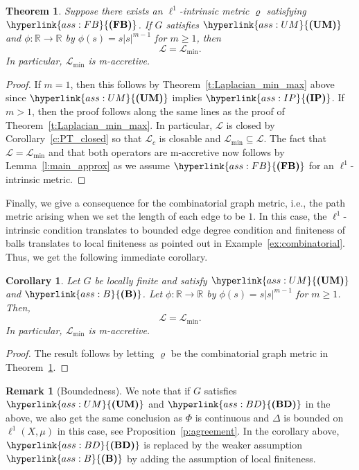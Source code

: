 \documentclass[letterpaper]{article}
\newtheorem{theorem}[lemma]{Theorem}
\newtheorem{corollary}[lemma]{Corollary}
\theoremstyle{definition}
\newtheorem{remark}[lemma]{Remark}
\theoremstyle{named}
\numberwithin{equation}{section}
\newcommand{\IP}{\hyperlink{ass:IP}{\textup{\textbf{(IP)}}}}
\newcommand{\UM}{\hyperlink{ass:UM}{\textup{\textbf{(UM)}}}}
\newcommand{\B}{\hyperlink{ass:B}{\textup{\textbf{(B)}}}}
\newcommand{\BD}{\hyperlink{ass:BD}{\textup{\textbf{(BD)}}}}
\newcommand{\FB}{\hyperlink{ass:FB}{\textup{\textbf{(FB)}}}}
\newcommand{\R}{\mathbb{R}}
\newcommand{\Deltaphi}{\mathcal{L}}
\newcommand{\deltaphim}{\mathcal{L}_{\min}}
\begin{document}
\begin{theorem}\label{t:min=max}
Suppose there exists an $\ell^1$-intrinsic metric $\varrho$ satisfying $\FB$.
If $G$ satisfies $\UM$ and $\phi\colon \R \to \R$ by $\phi(s) = s |s|^{m-1}$ for $m\geq1$, then
$$ \Deltaphi= \deltaphim.$$
In particular, $\deltaphim$ is m-accretive.
\end{theorem}
\begin{proof}
If $m=1$, then this follows by Theorem~\ref{t:Laplacian_min_max} above
since $\UM$ implies $\IP$.
If $m>1$, then the proof follows along the same lines as the proof of Theorem~\ref{t:Laplacian_min_max}.
In particular, $\Deltaphi$ is closed by Corollary~\ref{c:PT_closed} so that $\Deltaphi_c$
is closable and $\Deltaphi_{\min} \subseteq \Deltaphi$.
The fact that $\Deltaphi=\Deltaphi_{\min}$ and that both operators
are m-accretive now follows by Lemma~\ref{l:main_approx}
as we assume $\FB$ for an $\ell^1$-intrinsic metric. 
\end{proof}

Finally, we give a consequence for the combinatorial
graph metric, i.e., the path metric arising when we set the length of each edge 
to be $1$. In this case, the $\ell^1$-intrinsic condition translates to 
bounded edge degree condition and finiteness of balls translates to local finiteness
as pointed out in Example~\ref{ex:combinatorial}.
Thus, we get the following immediate corollary.

\begin{corollary}\label{c:graph_metric}
Let $G$ be locally finite and satisfy $\UM$ and $\B$.
Let $\phi\colon \R \to \R$ by $\phi(s) = s |s|^{m-1}$ for $m\geq1$.
Then,
$$\Deltaphi = \deltaphim.$$
In particular, $\deltaphim$ is  m-accretive.
\end{corollary}
\begin{proof}
    The result follows by letting $\varrho$ be the combinatorial
    graph metric in Theorem~\ref{t:min=max}.
\end{proof}

\begin{remark}[Boundedness]
    We note that if $G$ satisfies $\UM$ and $\BD$ in the above,
    we also get the same conclusion as $\Phi$ is continuous and $\Delta$ is bounded
    on $\ell^1(X,\mu)$ in this case, see Proposition~\ref{p:agreement}. 
    In the corollary above, $\BD$ is replaced by the weaker assumption
    $\B$ by adding the assumption of local finiteness.
\end{remark}
\end{document}
